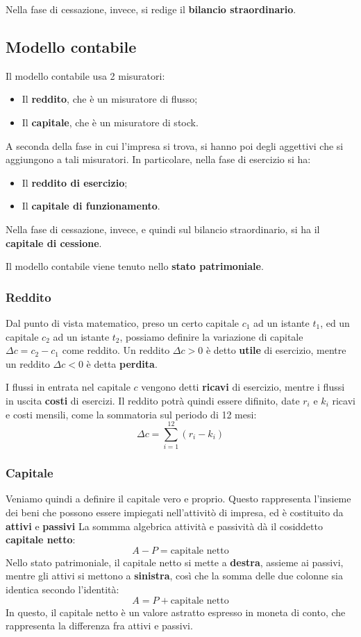 \documentclass[a4paper,11pt]{article}
\begin{document}
Nella fase di cessazione, invece, si redige il \textbf{bilancio straordinario}.

\subsection{Modello contabile}
Il modello contabile usa 2 misuratori:
\begin{itemize}
	\item Il \textbf{reddito}, che è un misuratore di flusso;
	\item Il \textbf{capitale}, che è un misuratore di stock.
\end{itemize}
A seconda della fase in cui l'impresa si trova, si hanno poi degli aggettivi che si aggiungono a tali misuratori.
In particolare, nella fase di esercizio si ha:
\begin{itemize}
	\item Il \textbf{reddito di esercizio};
	\item Il \textbf{capitale di funzionamento}.
\end{itemize}
Nella fase di cessazione, invece, e quindi sul bilancio straordinario, si ha il \textbf{capitale di cessione}. 

Il modello contabile viene tenuto nello \textbf{stato patrimoniale}. 

\subsubsection{Reddito}
Dal punto di vista matematico, preso un certo capitale $c_1$ ad un istante $t_1$, ed un capitale $c_2$ ad un istante $t_2$, possiamo definire la variazione di capitale $\Delta c = c_2 - c_1$ come reddito.
Un reddito $\Delta c > 0$ è detto \textbf{utile} di esercizio, mentre un reddito $\Delta c < 0$ è detta \textbf{perdita}.

I flussi in entrata nel capitale $c$ vengono detti \textbf{ricavi} di esercizio, mentre i flussi in uscita \textbf{costi} di esercizi.
Il reddito potrà quindi essere difinito, date $r_i$ e $k_i$ ricavi e costi mensili, come la sommatoria sul periodo di 12 mesi:
$$
\Delta c = \sum_{i = 1}^{12} \left( r_i - k_i \right)
$$

\subsubsection{Capitale}
Veniamo quindi a definire il capitale vero e proprio. 
Questo rappresenta l'insieme dei beni che possono essere impiegati nell'attivitò di impresa, ed è costituito da \textbf{attivi} e \textbf{passivi}  
La sommma algebrica attività e passività dà il cosiddetto \textbf{capitale netto}:
$$
A - P = \text{capitale netto}
$$
Nello stato patrimoniale, il capitale netto si mette a \textbf{destra}, assieme ai passivi, mentre gli attivi si mettono a \textbf{sinistra}, così che la somma delle due colonne sia identica secondo l'identità:
$$
A = P + \text{capitale netto}
$$
In questo, il capitale netto è un valore astratto espresso in moneta di conto, che rappresenta la differenza fra attivi e passivi.
\end{document}
